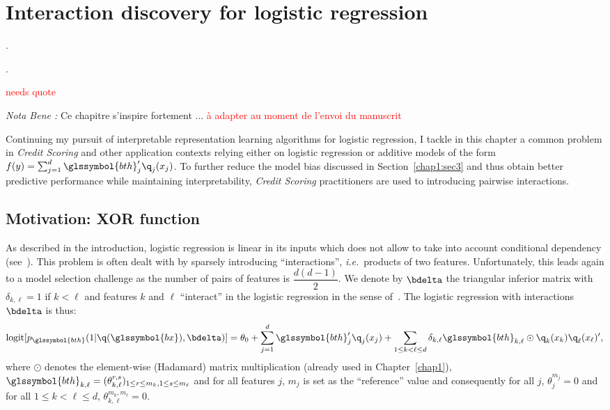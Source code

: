 \chapter{Interaction discovery for logistic regression} \label{chap5}

\epigraph{.}{.}

\minitoc


\textcolor{red}{needs quote}

\textit{Nota Bene :} Ce chapitre s'inspire fortement ... \textcolor{red}{à adapter au moment de l'envoi du manuscrit}

\bigskip


Continuing my pursuit of interpretable representation learning algorithms for logistic regression, I tackle in this chapter a common problem in \textit{Credit Scoring} and other application contexts relying either on logistic regression or additive models of the form $f(y) = \sum_{j=1}^d \glssymbol{bth}_j' \q_j(x_j)$. To further reduce the model bias discussed in Section~\ref{chap1:sec3} and thus obtain better predictive performance while maintaining interpretability, \textit{Credit Scoring} practitioners are used to introducing pairwise interactions.


\section{Motivation: XOR function}

As described in the introduction, logistic regression is linear in its inputs which does not allow to take into account conditional dependency (see~\cite{berry2010testing}). This problem is often dealt with by sparsely introducing ``interactions'', \textit{i.e.}\ products of two features. Unfortunately, this leads again to a model selection challenge as the number of pairs of features is $\dfrac{d(d-1)}{2}$. We denote by $\bdelta$ the triangular inferior matrix with $\delta_{k,\ell} = 1$ if $k < \ell$ and features $k$ and $\ell$ ``interact'' in the logistic regression in the sense of~\cite{berry2010testing}. The logistic regression with interactions $\bdelta$ is thus:
\begin{equation} \label{eq:reglog_sans}
\text{logit}[p_{\glssymbol{bth}}(1|\q(\glssymbol{bx}),\bdelta)] = \theta_{0} + \sum_{j=1}^d \glssymbol{bth}_j' \q_j(x_j) + \sum_{1 \leq k < \ell \leq d} \delta_{k,\ell} \glssymbol{bth}_{k,\ell} \odot \q_k(x_k) \q_\ell(x_\ell)',
\end{equation}
where $\odot$ denotes the element-wise (Hadamard) matrix multiplication (already used in Chapter~\ref{chap1}), $\glssymbol{bth}_{k,\ell} = (\theta_{k,\ell}^{r,s})_{1 \leq r \leq m_k, 1 \leq s \leq m_\ell}$ and for all features $j$, $m_j$ is set as the ``reference'' value and consequently for all $j$, $\theta_{j}^{m_j}=0$ and for all $1 \leq k < \ell \leq d$, $\theta_{k,\ell}^{m_k,m_{\ell}}=0$.

